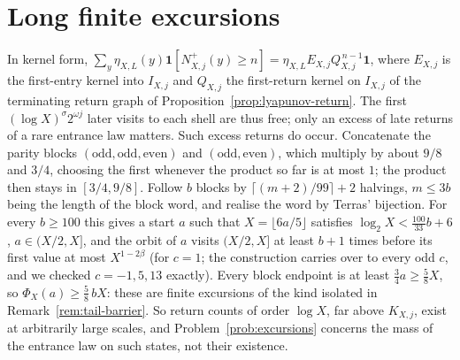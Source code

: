 \documentclass[11pt]{article}
\theoremstyle{remark}
\begin{document}
\section{Long finite excursions}

In kernel form, $\sum_y\eta_{X,L}(y)\mathbf 1[N^+_{X,j}(y)\ge n]=\eta_{X,L}E_{X,j}Q_{X,j}^{\,n-1}\mathbf 1$, where $E_{X,j}$ is the first-entry kernel into $I_{X,j}$ and $Q_{X,j}$ the first-return kernel on $I_{X,j}$ of the terminating return graph of Proposition~\ref{prop:lyapunov-return}. The first $(\log X)^\sigma2^{\omega j}$ later visits to each shell are thus free; only an excess of late returns of a rare entrance law matters. Such excess returns do occur. Concatenate the parity blocks $(\mathrm{odd},\mathrm{odd},\mathrm{even})$ and $(\mathrm{odd},\mathrm{even})$, which multiply by about $9/8$ and $3/4$, choosing the first whenever the product so far is at most $1$; the product then stays in $[3/4,9/8]$. Follow $b$ blocks by $\lceil(m+2)/99\rceil+2$ halvings, $m\le3b$ being the length of the block word, and realise the word by Terras' bijection. For every $b\ge100$ this gives a start $a$ such that $X=\lfloor6a/5\rfloor$ satisfies $\log_2X<\frac{100}{33}b+6$, $a\in(X/2,X]$, and the orbit of $a$ visits $(X/2,X]$ at least $b+1$ times before its first value at most $X^{1-2\beta}$ (for $c=1$; the construction carries over to every odd $c$, and we checked $c=-1,5,13$ exactly). Every block endpoint is at least $\frac34a\ge\frac58X$, so $\Phi_X(a)\ge\frac58\,bX$: these are finite excursions of the kind isolated in Remark~\ref{rem:tail-barrier}. So return counts of order $\log X$, far above $K_{X,j}$, exist at arbitrarily large scales, and Problem~\ref{prob:excursions} concerns the mass of the entrance law on such states, not their existence.
\end{document}
